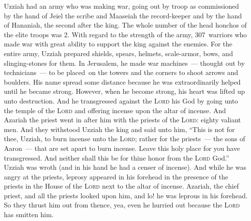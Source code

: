 \begin{inparaenum}
   Uzziah had an army who was making war, going out by troop as commissioned by the hand of Jeiel the scribe and Maaseiah the record-keeper and by the hand of Hananiah, the second after the king.%
   The whole number of the head honchos of the elite troops was 2.%
   With regard to the strength of the army, 307~warriors who made war with great ability to support the king against the enemies.%
   For the entire army, Uzziah prepared shields, spears, helmets, scale-armor, bows, and slinging-stones for them.%
   In Jerusalem, he made war machines~--- thought out by technicians~--- to be placed\understood\ on the towers and the corners to shoot arrows and boulders. His name spread some distance because he was extraordinarily helped  until he became strong.%
   However, when he become strong, his heart was lifted up unto destruction. And he transgressed against the \textsc{Lord} his God by going unto the temple of the \textsc{Lord} and offering incense upon the altar of incense.%
   And Azariah the priest went in after him with the priests of the \textsc{Lord}: eighty valiant men.%
   And they withstood Uzziah the king and said unto him, ``This is not for thee, Uzziah, to burn incense unto the \textsc{Lord}; rather for the priests~--- the sons of Aaron~--- that are set apart to burn incense. Leave this holy place for you have transgressed. And neither shall this be for thine honor from the \textsc{Lord} God.''%
   Uzziah was wroth (and in his hand he had a censer of incense). And while he was angry at the priests, leprosy appeared in his forehead in the presence of the priests in the House of the \textsc{Lord} next to the altar of incense.%
   Azariah, the chief priest, and all the priests looked upon him, and lo! he was leprous in his forehead. So they thrust him out from thence, yea, even he hurried out because the \textsc{Lord} has smitten him.%

\end{inparaenum}
